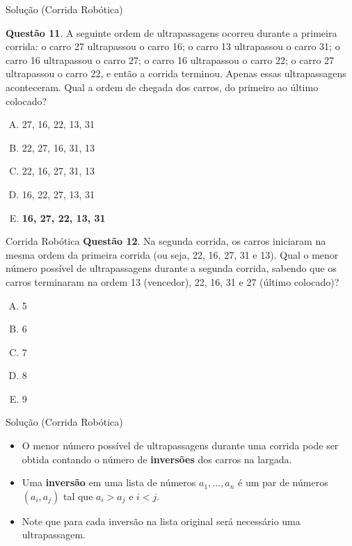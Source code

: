 \documentclass{beamer}
\begin{document}
\begin{frame}{Solução (Corrida Robótica)}


\textbf{Questão 11}. A seguinte ordem de ultrapassagens ocorreu durante a primeira corrida: o carro 27 ultrapassou o carro 16; o carro 13 ultrapassou o carro 31; o carro 16 ultrapassou o carro 27; o carro 16 ultrapassou o carro 22; o carro 27 ultrapassou o carro 22, e então a corrida terminou. Apenas essas ultrapassagens aconteceram. Qual a ordem de chegada dos carros, do primeiro ao
último colocado?

\begin{enumerate}[(A)]
    \item 27, 16, 22, 13, 31
    \item 22, 27, 16, 31, 13
    \item 22, 16, 27, 31, 13
    \item 16, 22, 27, 13, 31
    \item \textbf{16, 27, 22, 13, 31}
\end{enumerate}
\end{frame}


\begin{frame}{Corrida Robótica}
\textbf{Questão 12}. Na segunda corrida, os carros iniciaram na mesma ordem da primeira corrida (ou seja, 22, 16, 27, 31 e 13). Qual o menor número possível de ultrapassagens durante a segunda corrida, sabendo que os carros terminaram na ordem 13 (vencedor), 22, 16, 31 e 27 (último colocado)?

\begin{enumerate}[(A)]
    \item 5
    \item 6
    \item 7
    \item 8
    \item 9
\end{enumerate}
\end{frame}


\begin{frame}{Solução (Corrida Robótica)}

\begin{itemize}

\pause \item O menor número possível de ultrapassagens durante uma corrida pode ser obtida contando o número de \textbf{inversões} dos carros na largada. 


\pause \item Uma \textbf{inversão} em uma lista de números $a_1, \ldots, a_n$ é um par de números $(a_i,a_j)$ tal que $a_i > a_j$ e $i < j$. 

\pause \item Note que para cada inversão na lista original será necessário uma ultrapassagem.

\end{itemize}

\end{frame}
\end{document}

